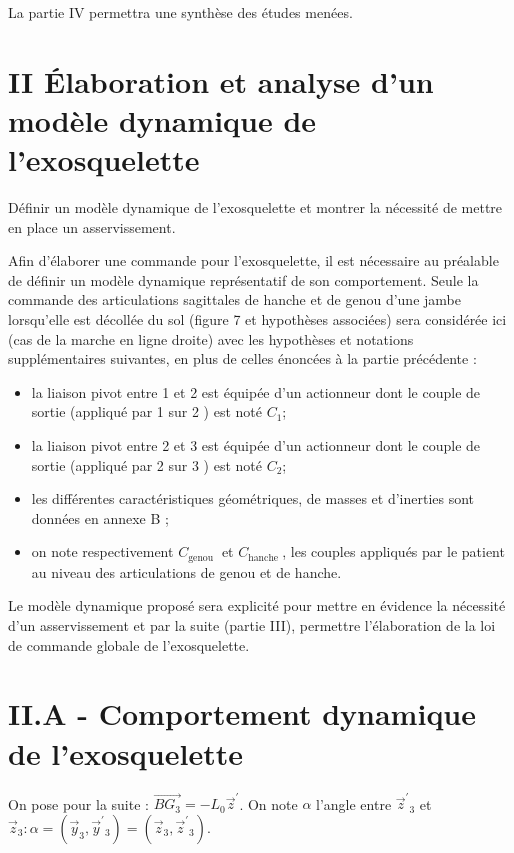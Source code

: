 \documentclass[10pt]{article}
\begin{document}
La partie IV permettra une synthèse des études menées.

\section{II Élaboration et analyse d'un modèle dynamique de l'exosquelette}
Définir un modèle dynamique de l’exosquelette et montrer la nécessité de mettre en place un asservissement.

Afin d'élaborer une commande pour l'exosquelette, il est nécessaire au préalable de définir un modèle dynamique représentatif de son comportement. Seule la commande des articulations sagittales de hanche et de genou d'une jambe lorsqu'elle est décollée du sol (figure 7 et hypothèses associées) sera considérée ici (cas de la marche en ligne droite) avec les hypothèses et notations supplémentaires suivantes, en plus de celles énoncées à la partie précédente :

\begin{itemize}
  \item la liaison pivot entre 1 et 2 est équipée d'un actionneur dont le couple de sortie (appliqué par 1 sur 2 ) est noté $C_{1}$;

  \item la liaison pivot entre 2 et 3 est équipée d'un actionneur dont le couple de sortie (appliqué par 2 sur 3 ) est noté $C_{2}$;

  \item les différentes caractéristiques géométriques, de masses et d'inerties sont données en annexe B ;

  \item on note respectivement $C_{\text {genou }}$ et $C_{\text {hanche }}$, les couples appliqués par le patient au niveau des articulations de genou et de hanche.

\end{itemize}

Le modèle dynamique proposé sera explicité pour mettre en évidence la nécessité d'un asservissement et par la suite (partie III), permettre l'élaboration de la loi de commande globale de l'exosquelette.

\section{II.A - Comportement dynamique de l'exosquelette}
On pose pour la suite : $\overrightarrow{B G_{3}}=-L_{0} \vec{z}^{\prime}$. On note $\alpha$ l'angle entre $\vec{z}^{\prime}{ }_{3}$ et $\vec{z}_{3}: \alpha=\left(\vec{y}_{3}, \vec{y}^{\prime}{ }_{3}\right)=\left(\vec{z}_{3}, \vec{z}^{\prime}{ }_{3}\right)$.
\end{document}
